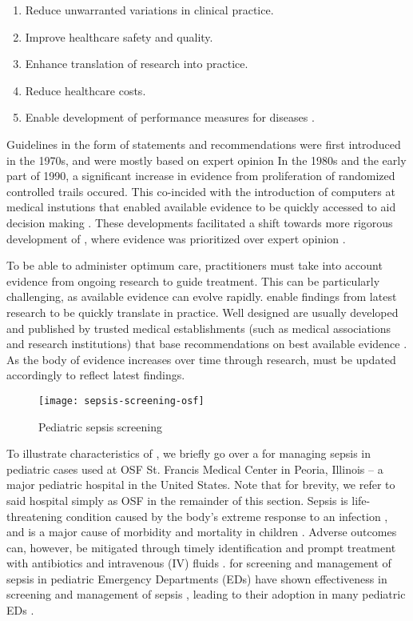 \begin{enumerate}
  \item Reduce unwarranted variations in clinical practice.
  \item Improve healthcare safety and quality.
  \item Enhance translation of research into practice.
  \item Reduce healthcare costs.
  \item Enable development of performance measures for diseases
    \cite{GuerraInjury23, BusseWHO19}.
\end{enumerate}

Guidelines in the form of statements and recommendations
were first introduced in the 1970s,
and were mostly based on expert opinion
In the 1980s and the early part of 1990,
a significant increase in evidence from proliferation of randomized controlled
trails occured. This co-incided with the introduction
of computers at medical instutions that enabled available evidence
to be quickly accessed to aid decision making \cite{GuyattAMA92,SackettJPH95}.
These developments facilitated a shift towards more rigorous
development of \BPGs{}, where evidence was prioritized over expert opinion
\cite{GuerraInjury23}.

To be able to administer optimum care, practitioners must take into
account evidence from ongoing research to guide treatment. This
can be particularly challenging, as available evidence can evolve rapidly.
\BPGs{} enable findings from latest research to be quickly translate in
practice. Well designed \BPGs{} are usually developed and published by trusted medical
establishments (such as medical associations and research institutions)
that base recommendations on best available evidence \cite{GuerraInjury23}.
As the body of evidence increases over time through research,
\BPGs{} must be updated accordingly to reflect latest findings.

\begin{figure}[b!]
  \centering
  \texttt{[image: sepsis-screening-osf]}
  \caption{Pediatric sepsis screening \BPG{}}\label{fig:sepsis-screening}
\end{figure}

To illustrate characteristics of \BPGs{}, we briefly go over a \BPG{}
for managing sepsis in pediatric cases used at OSF St. Francis Medical Center
in Peoria, Illinois -- a major pediatric hospital in the United States. Note
that for brevity, we refer to said hospital simply as OSF in the remainder of
this section.
Sepsis is life-threatening condition caused by the body's extreme response to
an infection \cite{RhodesICM17}, and is
a major cause of morbidity and mortality in children \cite{Eisenberg2021JP}.
Adverse outcomes can, however, be mitigated through timely
identification and prompt treatment with antibiotics and
intravenous (IV) fluids \cite{Weiss2014CCM,Evans2018JAMA}.
\BPGs{} for screening and management of sepsis in pediatric Emergency
Departments (EDs) have shown effectiveness in screening and management of sepsis \cite{Eisenberg2021JP},
leading to their adoption in many pediatric EDs \cite{Balamuth2017EM,Sepanski2014FP}.

